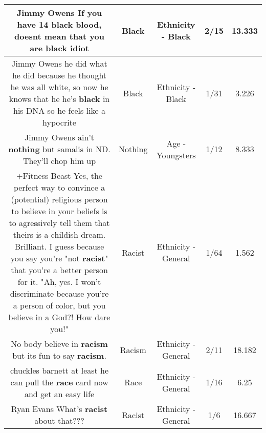 \documentclass[11pt]{article}
\newlength\mylength
\begin{document}
\begin{center}
\begin{longtable}{|C{.65\mylength}|C{.30\mylength}|C{.12\mylength}|C{.12\mylength}|C{.12\mylength}|}
  \small Jimmy Owens If you have 14 \textbf{black} blood, doesnt mean that you are \textbf{black} idiot\normalsize   & Black & Ethnicity - Black & 2/15 & 13.333 \\  \hline
  \small Jimmy Owens he did what he did because he thought he was all white, so now he knows that he he's \textbf{black} in his DNA so he feels like a hypocrite\normalsize   & Black & Ethnicity - Black & 1/31 & 3.226 \\  \hline
  \small Jimmy Owens ain't \textbf{nothing} but samalis in ND.  They'll chop him up\normalsize   & Nothing & Age - Youngsters & 1/12 & 8.333 \\  \hline
  \small +Fitness Beast Yes, the perfect way to convince a (potential) religious person to believe in your beliefs is to agressively tell them that theirs is a childish dream. Brilliant. I guess because you say you're "not \textbf{racist}" that you're a better person for it. "Ah, yes. I won't discriminate because you're a person of color, but you believe in a God?! How dare you!"\normalsize   & Racist & Ethnicity - General & 1/64 & 1.562 \\  \hline
  \small No body believe in \textbf{racism} but its fun to say \textbf{racism}.\normalsize   & Racism & Ethnicity - General & 2/11 & 18.182 \\  \hline
  \small chuckles barnett at least he can pull the \textbf{race} card now and get an easy life\normalsize   & Race & Ethnicity - General & 1/16 & 6.25 \\  \hline
  \small Ryan Evans What's \textbf{racist} about that???\normalsize   & Racist & Ethnicity - General & 1/6 & 16.667 \\  \hline

\end{longtable}
\end{center}
\end{document}
